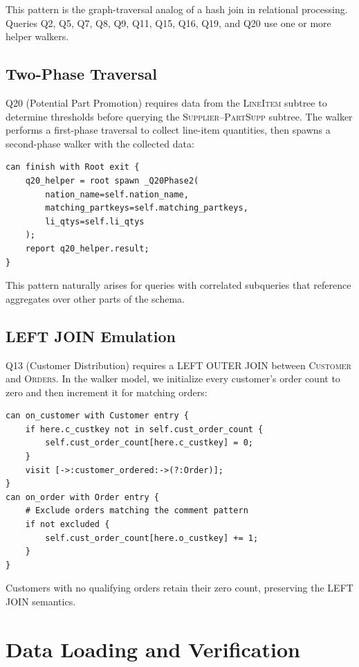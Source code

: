 \documentclass[11pt]{article}
\begin{document}
This pattern is the graph-traversal analog of a hash join in relational
processing.
Queries Q2, Q5, Q7, Q8, Q9, Q11, Q15, Q16, Q19, and Q20 use one or more
helper walkers.

\subsection{Two-Phase Traversal}

Q20 (Potential Part Promotion) requires data from the \textsc{LineItem}
subtree to determine thresholds before querying the
\textsc{Supplier}--\textsc{PartSupp} subtree.
The walker performs a first-phase traversal to collect line-item quantities,
then spawns a second-phase walker with the collected data:

\begin{lstlisting}
can finish with Root exit {
    q20_helper = root spawn _Q20Phase2(
        nation_name=self.nation_name,
        matching_partkeys=self.matching_partkeys,
        li_qtys=self.li_qtys
    );
    report q20_helper.result;
}
\end{lstlisting}

This pattern naturally arises for queries with correlated subqueries that
reference aggregates over other parts of the schema.

\subsection{LEFT JOIN Emulation}

Q13 (Customer Distribution) requires a LEFT OUTER JOIN between
\textsc{Customer} and \textsc{Orders}.
In the walker model, we initialize every customer's order count to zero
and then increment it for matching orders:

\begin{lstlisting}
can on_customer with Customer entry {
    if here.c_custkey not in self.cust_order_count {
        self.cust_order_count[here.c_custkey] = 0;
    }
    visit [->:customer_ordered:->(?:Order)];
}
can on_order with Order entry {
    # Exclude orders matching the comment pattern
    if not excluded {
        self.cust_order_count[here.o_custkey] += 1;
    }
}
\end{lstlisting}

Customers with no qualifying orders retain their zero count, preserving
the LEFT JOIN semantics.

\section{Data Loading and Verification}
\end{document}
